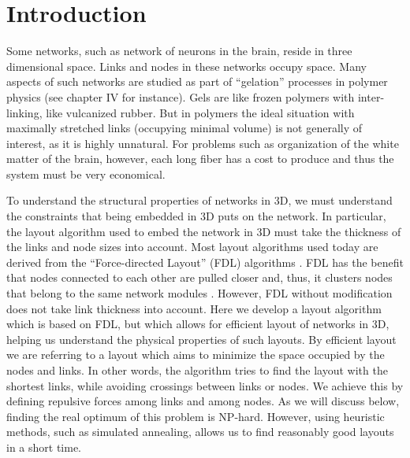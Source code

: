 \documentclass[endfloats,nofootinbib,preprint,floatfix,titlepage,superscriptaddress]{revtex4} %
\newcommand{\finV}[2]{#1}
\begin{document}
\finV{
\renewcommand{\citep}[1]{}
}{
\maketitle
}


\tableofcontents


\section{Introduction}
Some networks, such as network of neurons in the brain, reside in three dimensional space. 
Links and nodes in these networks occupy space. 
Many aspects of such networks are studied  as part of ``gelation'' processes in polymer physics (see \citep{de1979scaling} chapter IV for instance). 
Gels are like frozen polymers with inter-linking, like vulcanized rubber. But in polymers the ideal situation with maximally stretched links (occupying minimal volume) is not generally of interest, as it is highly unnatural. 
For problems such as organization of the white matter of the brain, however, each long fiber has a cost to produce and thus the system must be very economical.

To understand the structural properties of networks in 3D, we must understand the constraints that being embedded in 3D puts on the network. 
In particular, the layout algorithm used to embed the network in 3D must take the thickness of the links and node sizes into account. 
Most layout algorithms used today are derived from the ``Force-directed Layout'' (FDL) algorithms \citep{davidson1996drawing,kamada1989algorithm}. 
FDL has the benefit that nodes connected to each other are pulled closer and, thus, it clusters nodes that belong to the same network modules \citep{noack2009modularity}. 
However, FDL without modification does not take link thickness into account. 
Here we develop a layout algorithm which is based on FDL, but which allows for efficient layout of networks in 3D, helping us understand the physical properties of such layouts.
By efficient layout we are referring to a layout which aims to minimize the space occupied by the nodes and links. 
In other words, the algorithm tries to find the layout with the shortest links, while avoiding crossings between links or nodes.
We achieve this by defining repulsive forces among links and among nodes. 
As we will discuss below, finding the real optimum of this problem is NP-hard. 
However, using heuristic methods, such as simulated annealing, allows us to find reasonably good layouts in a short time.  
\end{document}
